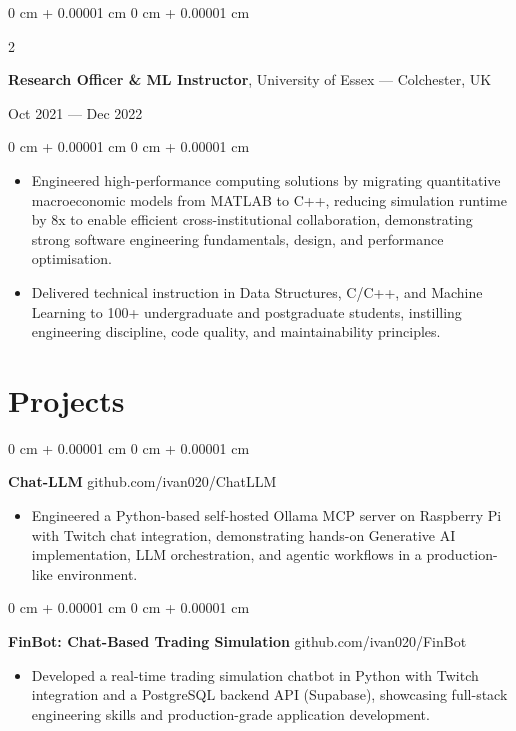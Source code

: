 \documentclass[6pt, letterpaper]{article}
\newenvironment{highlights}{
    \begin{itemize}[
        topsep=0.03 cm,
        parsep=0.03 cm,
        partopsep=0pt,
        itemsep=0pt,
        leftmargin=0 cm + 10pt
    ]
}{
    \end{itemize}
} %
\newenvironment{onecolentry}{
    \begin{adjustwidth}{
        0 cm + 0.00001 cm
    }{
        0 cm + 0.00001 cm
    }
}{
    \end{adjustwidth}
} %
\newenvironment{twocolentry}[2][]{
    \onecolentry
    \def\secondColumn{#2}
    \setcolumnwidth{\fill, 4.5 cm}
    \begin{paracol}{2}
}{
    \switchcolumn \raggedleft \secondColumn
    \end{paracol}
    \endonecolentry
} %
\begin{document}
        \begin{twocolentry}{Oct 2021 --- Dec 2022}
        \textbf{Research Officer \& ML Instructor}, University of Essex --- Colchester, UK
        \end{twocolentry}

        \begin{onecolentry}
        \begin{highlights}
        \item Engineered high-performance computing solutions by migrating quantitative macroeconomic models from MATLAB to C++, reducing simulation runtime by 8x to enable efficient cross-institutional collaboration, demonstrating strong software engineering fundamentals, design, and performance optimisation.
        \item Delivered technical instruction in Data Structures, C/C++, and Machine Learning to 100+ undergraduate and postgraduate students, instilling engineering discipline, code quality, and maintainability principles.
        \end{highlights}
        \end{onecolentry}


    \section{Projects}

    \begin{onecolentry}
        \textbf{Chat-LLM} \hfill github.com/ivan020/ChatLLM

        \begin{highlights}
            \item Engineered a Python-based self-hosted Ollama MCP server on Raspberry Pi with Twitch chat integration, demonstrating hands-on Generative AI implementation, LLM orchestration, and agentic workflows in a production-like environment.
        \end{highlights}
    \end{onecolentry}

    \begin{onecolentry}
        \textbf{FinBot: Chat-Based Trading Simulation} \hfill github.com/ivan020/FinBot

        \begin{highlights}
            \item Developed a real-time trading simulation chatbot in Python with Twitch integration and a PostgreSQL backend API (Supabase), showcasing full-stack engineering skills and production-grade application development.
        \end{highlights}
    \end{onecolentry}
\end{document}
